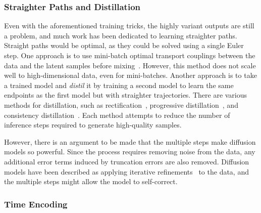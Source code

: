 \subsubsection{Straighter Paths and Distillation}

Even with the aforementioned training tricks, the highly variant outputs are still a problem, and much work has been dedicated to learning straighter paths.
Straight paths would be optimal, as they could be solved using a single Euler step.
One approach is to use mini-batch optimal transport couplings between the data and the latent samples before mixing~\cite{ImprovingGeneralizingFlowbased}.
However, this method does not scale well to high-dimensional data, even for mini-batches.
Another approach is to take a trained model and \textit{distil} it by training a second model to learn the same endpoints as the first model but with straighter trajectories.
There are various methods for distillation, such as rectification~\cite{FlowStraightFast}, progressive distillation~\cite{ProgressiveDistillationFast}, and consistency distillation~\cite{ConsistencyModels}.
Each method attempts to reduce the number of inference steps required to generate high-quality samples.

However, there is an argument to be made that the multiple steps make diffusion models so powerful.
Since the process requires removing noise from the data, any additional error terms induced by truncation errors are also removed.
Diffusion models have been described as applying iterative refinements~\cite{ImageSuperResolutionIterative} to the data, and the multiple steps might allow the model to self-correct.

\subsubsection{Time Encoding}

